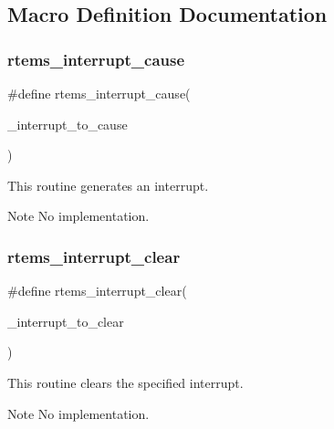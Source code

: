 \subsection{Macro Definition Documentation}
\mbox{\label{group__ClassicINTR_gab8bfce3dc5dcc32b753742c3c14ac8df}} 
\subsubsection{\texorpdfstring{rtems\_interrupt\_cause}{rtems\_interrupt\_cause}}
{\footnotesize\ttfamily \#define rtems\+\_\+interrupt\+\_\+cause(\begin{DoxyParamCaption}\item[{}]{\+\_\+interrupt\+\_\+to\+\_\+cause }\end{DoxyParamCaption})}



This routine generates an interrupt. 

\begin{DoxyNote}{Note}
No implementation. 
\end{DoxyNote}
\mbox{\label{group__ClassicINTR_ga51ee1b4b829b95f9bddf5800ff0982d4}} 
\subsubsection{\texorpdfstring{rtems\_interrupt\_clear}{rtems\_interrupt\_clear}}
{\footnotesize\ttfamily \#define rtems\+\_\+interrupt\+\_\+clear(\begin{DoxyParamCaption}\item[{}]{\+\_\+interrupt\+\_\+to\+\_\+clear }\end{DoxyParamCaption})}



This routine clears the specified interrupt. 

\begin{DoxyNote}{Note}
No implementation. 
\end{DoxyNote}
\mbox{\label{group__ClassicINTR_gaf105388007be1416e810e1522cfe16e1}} 
